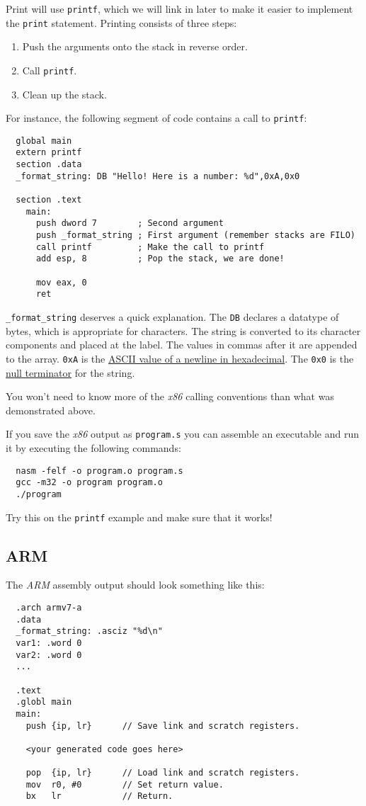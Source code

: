 \documentclass{article}
\newcommand{\code}[1]{\texttt{\textmd{#1}}}
\begin{document}
Print will use \code{printf}, which we will link in later to make it easier to implement the
\code{print} statement. Printing consists of three steps:
\begin{enumerate}
  \item Push the arguments onto the stack in reverse order.
  \item Call \code{printf}.
  \item Clean up the stack.
\end{enumerate}

For instance, the following segment of code contains a call to \code{printf}:
\begin{lstlisting}
  global main
  extern printf
  section .data
  _format_string: DB "Hello! Here is a number: %d",0xA,0x0

  section .text
    main:
      push dword 7        ; Second argument
      push _format_string ; First argument (remember stacks are FILO)
      call printf         ; Make the call to printf
      add esp, 8          ; Pop the stack, we are done!

      mov eax, 0
      ret
\end{lstlisting}

\code{\_format\_string} deserves a quick explanation. The \code{DB} declares a datatype of bytes,
which is appropriate for characters. The string is converted to its character components and
placed at the label. The values in commas after it are appended to the array. \code{0xA} is the
\href{http://www.asciitable.com/}{ASCII value of a newline in hexadecimal}. The \code{0x0} is the
\href{https://en.wikipedia.org/wiki/Null-terminated_string}{null terminator} for the string.

You won't need to know more of the \textit{x86} calling conventions than what was demonstrated
above.

If you save the \textit{x86} output as \code{program.s} you can assemble an executable and run it
by executing the following commands:
\begin{lstlisting}
  nasm -felf -o program.o program.s
  gcc -m32 -o program program.o
  ./program
\end{lstlisting}

Try this on the \code{printf} example and make sure that it works!

\subsection{ARM}
The \textit{ARM} assembly output should look something like this:
\begin{lstlisting}
  .arch armv7-a
  .data
  _format_string: .asciz "%d\n"
  var1: .word 0
  var2: .word 0
  ...

  .text
  .globl main
  main:
    push {ip, lr}      // Save link and scratch registers.

    <your generated code goes here>

    pop  {ip, lr}      // Load link and scratch registers.
    mov  r0, #0        // Set return value.
    bx   lr            // Return.
\end{lstlisting}
\end{document}
